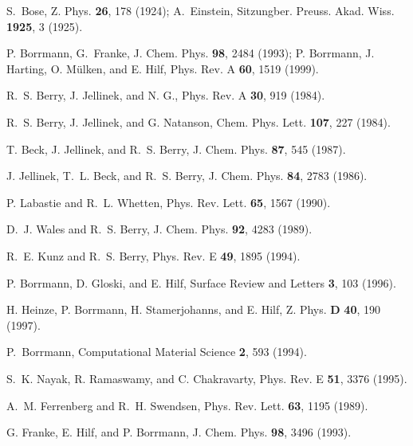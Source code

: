 \begin{thebibliography}{27}
S.~Bose, Z. Phys. {\bf 26}, 178 (1924);
A.~Einstein, Sitzungber. Preuss. Akad. Wiss. {\bf 1925}, 3 (1925).

P. Borrmann, G.~Franke, J. Chem. Phys. {\bf 98}, 2484 (1993);
P. Borrmann, J. Harting, O. M{\"u}lken, and E. Hilf, Phys. Rev. A {\bf
  60},  1519  (1999).

R.~S. Berry, J. Jellinek, and N. G., Phys. Rev. A {\bf 30},  919   (1984).

R.~S. Berry, J. Jellinek, and G. Natanson, Chem. Phys. Lett. {\bf 107},  227
  (1984).

T. Beck, J. Jellinek, and R.~S. Berry, J. Chem. Phys. {\bf 87},  545   (1987).

J. Jellinek, T.~L. Beck, and R.~S. Berry, J. Chem. Phys. {\bf 84},  2783
  (1986).

P. Labastie and R.~L. Whetten, Phys. Rev. Lett. {\bf 65},  1567   (1990).

D.~J. Wales and R.~S. Berry, J. Chem. Phys. {\bf 92},  4283   (1989).

R.~E. Kunz and R.~S. Berry, Phys. Rev. E {\bf 49},  1895   (1994).

P. Borrmann, D. Gloski, and E. Hilf, Surface Review and Letters {\bf 3},  103
  (1996).

H. Heinze, P. Borrmann, H. Stamerjohanns, and E. Hilf, Z. Phys. {\bf D} {\bf
  40},  190  (1997).

P.~Borrmann, Computational Material Science {\bf 2}, 593 (1994).

S.~K. Nayak, R. Ramaswamy, and C. Chakravarty, Phys. Rev. E {\bf 51},  3376
  (1995).

A.~M. Ferrenberg and R.~H. Swendsen, Phys. Rev. Lett. {\bf 63},  1195  (1989).

G. Franke, E. Hilf, and P. Borrmann, J. Chem. Phys. {\bf 98},  3496  (1993).


\end{thebibliography}

